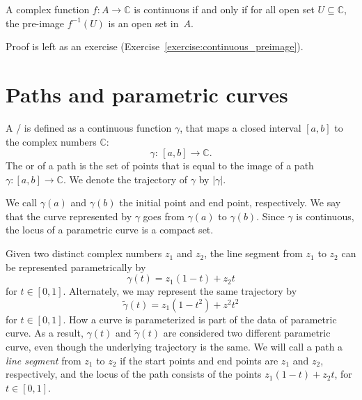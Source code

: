\begin{svgraybox}
	\begin{theorem} \label{thm:continuous_preimage}
A complex function $f: A \rightarrow \mathbb{C}$ is continuous if and only if for all open set $U \subseteq \mathbb{C}$, the pre-image $f^{-1}(U)$ is an open set in~$A$. 
	\end{theorem}
\end{svgraybox}

Proof is left as an exercise (Exercise~\ref{exercise:continuous_preimage}).


\section{Paths and parametric curves}


  
\begin{svgraybox}
	\begin{definition}
A / is defined as a continuous function $\gamma$, that maps a closed interval $[a,b]$ to the complex numbers $\mathbb{C}$:
		\begin{equation}
			\gamma :\, [a,b] \rightarrow \mathbb{C}.
			\label{eq:parametric_curve_def}
		\end{equation}
The  or  of a path is the set of points that is equal to the image of a path $\gamma: [a,b]\rightarrow\mathbb{C}$. We  denote the trajectory of $\gamma$ by $|\gamma|$.
	\end{definition}
\end{svgraybox} 
We call $\gamma(a)$ and $\gamma(b)$ the initial point and end point, respectively. We say that the curve represented by $\gamma$ goes from $\gamma(a)$ to $\gamma(b)$. Since $\gamma$ is continuous, the locus of a parametric curve is a compact set.

Given two distinct complex numbers $z_1$ and $z_2$, the line segment from $z_1$ to $z_2$ can be represented parametrically by
$$
\gamma(t) = z_1(1-t) + z_2 t
$$
for $t\in [0,1]$. Alternately, we may represent the same trajectory by
$$
\tilde{\gamma}(t) = z_1(1-t^2) + z^2 t^2
$$
for $t\in [0,1]$. How a curve is parameterized is part of the data of parametric curve. As a result, $\gamma(t)$ and $\tilde{\gamma}(t)$ are considered two different parametric curve, even though the underlying trajectory is the same. We will call a path a {\em line segment} from $z_1$ to $z_2$ if the start points and end points are $z_1$ and $z_2$, respectively, and the locus of the path consists of the points $z_1(1-t) + z_2t$, for $t\in [0,1]$.


